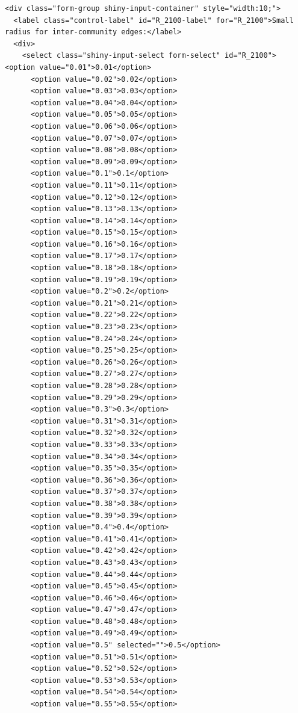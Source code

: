 \documentclass[
  letterpaper,
  DIV=11,
  numbers=noendperiod]{scrartcl}
\begin{document}
\label{input_selects_100-7}
\begin{verbatim}
<div class="form-group shiny-input-container" style="width:10;">
  <label class="control-label" id="R_2100-label" for="R_2100">Small radius for inter-community edges:</label>
  <div>
    <select class="shiny-input-select form-select" id="R_2100">      <option value="0.01">0.01</option>
      <option value="0.02">0.02</option>
      <option value="0.03">0.03</option>
      <option value="0.04">0.04</option>
      <option value="0.05">0.05</option>
      <option value="0.06">0.06</option>
      <option value="0.07">0.07</option>
      <option value="0.08">0.08</option>
      <option value="0.09">0.09</option>
      <option value="0.1">0.1</option>
      <option value="0.11">0.11</option>
      <option value="0.12">0.12</option>
      <option value="0.13">0.13</option>
      <option value="0.14">0.14</option>
      <option value="0.15">0.15</option>
      <option value="0.16">0.16</option>
      <option value="0.17">0.17</option>
      <option value="0.18">0.18</option>
      <option value="0.19">0.19</option>
      <option value="0.2">0.2</option>
      <option value="0.21">0.21</option>
      <option value="0.22">0.22</option>
      <option value="0.23">0.23</option>
      <option value="0.24">0.24</option>
      <option value="0.25">0.25</option>
      <option value="0.26">0.26</option>
      <option value="0.27">0.27</option>
      <option value="0.28">0.28</option>
      <option value="0.29">0.29</option>
      <option value="0.3">0.3</option>
      <option value="0.31">0.31</option>
      <option value="0.32">0.32</option>
      <option value="0.33">0.33</option>
      <option value="0.34">0.34</option>
      <option value="0.35">0.35</option>
      <option value="0.36">0.36</option>
      <option value="0.37">0.37</option>
      <option value="0.38">0.38</option>
      <option value="0.39">0.39</option>
      <option value="0.4">0.4</option>
      <option value="0.41">0.41</option>
      <option value="0.42">0.42</option>
      <option value="0.43">0.43</option>
      <option value="0.44">0.44</option>
      <option value="0.45">0.45</option>
      <option value="0.46">0.46</option>
      <option value="0.47">0.47</option>
      <option value="0.48">0.48</option>
      <option value="0.49">0.49</option>
      <option value="0.5" selected="">0.5</option>
      <option value="0.51">0.51</option>
      <option value="0.52">0.52</option>
      <option value="0.53">0.53</option>
      <option value="0.54">0.54</option>
      <option value="0.55">0.55</option>

\end{verbatim}
\end{document}
